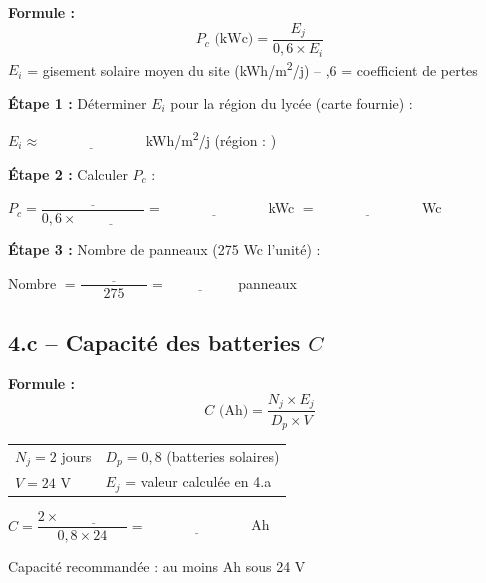 \documentclass[a4paper, 11pt, oneside]{article}
\begin{document}
\begin{tcolorbox}[colback=orangecol!10, colframe=orangecol]
\textbf{Formule :}
\[
P_c \text{ (kWc)} = \frac{E_j}{0{,}6 \times E_i}
\]
$E_i$ = gisement solaire moyen du site (kWh/m\textsuperscript{2}/j) \quad -- ,6 = coefficient de pertes

\vspace{0.4cm}
\textbf{Étape 1 :} Déterminer $E_i$ pour la région du lycée (carte fournie) :

$E_i \approx \underline{\hspace{3cm}}$ kWh/m\textsuperscript{2}/j \quad (région : \underline{\hspace{3cm}})

\vspace{0.4cm}
\textbf{Étape 2 :} Calculer $P_c$ :

$P_c = \dfrac{\underline{\hspace{2cm}}}{0{,}6 \times \underline{\hspace{2cm}}} = \underline{\hspace{3cm}}$ kWc $= \underline{\hspace{3cm}}$ Wc

\vspace{0.4cm}
\textbf{Étape 3 :} Nombre de panneaux (275 Wc l'unité) :

Nombre $= \dfrac{\underline{\hspace{2cm}}}{275} = \underline{\hspace{2cm}}$ panneaux
\end{tcolorbox}

\vspace{0.8cm}

\subsection*{4.c -- Capacité des batteries $C$}

\begin{tcolorbox}[colback=orangecol!10, colframe=orangecol]
\textbf{Formule :}
\[
C \text{ (Ah)} = \frac{N_j \times E_j}{D_p \times V}
\]

\begin{tabular}{ll}
$N_j = 2$ jours & $D_p = 0{,}8$ (batteries solaires) \\
$V = 24$ V & $E_j$ = valeur calculée en 4.a
\end{tabular}

\vspace{0.4cm}
$C = \dfrac{2 \times \underline{\hspace{2cm}}}{0{,}8 \times 24} = \underline{\hspace{3cm}}$ Ah

Capacité recommandée : au moins \underline{\hspace{2.5cm}} Ah sous 24 V
\end{tcolorbox}
\end{document}
